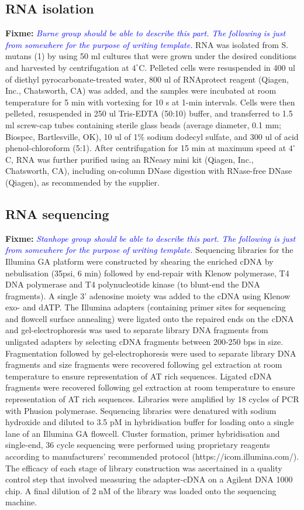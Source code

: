 \documentclass{article}
\newcommand{\fixme}[1]{{\textbf{Fixme:} \textit{\textcolor{blue}{#1}}}}
\begin{document}
\subsection{RNA isolation}
\fixme{Burne group should be able to describe this part. The following is just
from somewhere for the purpose of writing template.}
RNA was isolated from S. mutans (1) by using 50 ml cultures that were grown
under the desired conditions and harvested by centrifugation at $4^{\circ}$C. Pelleted
cells were resuspended in 400 ul of diethyl pyrocarbonate-treated water, 800 ul
of RNAprotect reagent (Qiagen, Inc., Chatsworth, CA) was added, and the samples
were incubated at room temperature for 5 min with vortexing for 10 s at 1-min
intervals. Cells were then pelleted, resuspended in 250 ul Tris-EDTA (50:10)
buffer, and transferred to 1.5 ml screw-cap tubes containing sterile glass beads
(average diameter, 0.1 mm; Biospec, Bartlesville, OK), 10 ul of 1\% sodium
dodecyl sulfate, and 300 ul of acid phenol-chloroform (5:1). After
centrifugation for 15 min at maximum speed at $4^{\circ}$C, RNA was further purified
using an RNeasy mini kit (Qiagen, Inc., Chatsworth, CA), including on-column
DNase digestion with RNase-free DNase (Qiagen), as recommended by the supplier.

\subsection{RNA sequencing}
\fixme{Stanhope group should be able to describe this part. The following is just
from somewhere for the purpose of writing template.}
Sequencing libraries for the Illumina GA platform were constructed by shearing
the enriched cDNA by nebulisation (35psi, 6 min) followed by end-repair with
Klenow polymerase, T4 DNA polymerase and T4 polynucleotide kinase (to blunt-end
the DNA fragments). A single 3' adenosine moiety was added to the cDNA using
Klenow exo- and dATP. The Illumina adapters (containing primer sites for
sequencing and flowcell surface annealing) were ligated onto the repaired ends
on the cDNA and gel-electrophoresis was used to separate library DNA fragments
from unligated adapters by selecting cDNA fragments between 200-250 bps in size.
Fragmentation followed by gel-electrophoresis were used to separate library DNA
fragments and size fragments were recovered following gel extraction at room
temperature to ensure representation of AT rich sequences. Ligated cDNA
fragments were recovered following gel extraction at room temperature to ensure
representation of AT rich sequences. Libraries were amplified by 18 cycles of
PCR with Phusion polymerase. Sequencing libraries were denatured with sodium
hydroxide and diluted to 3.5 pM in hybridisation buffer for loading onto a
single lane of an Illumina GA flowcell. Cluster formation, primer hybridisation
and single-end, 36 cycle sequencing were performed using proprietary reagents
according to manufacturers' recommended protocol (https://icom.illumina.com/).
The efficacy of each stage of library construction was ascertained in a quality
control step that involved measuring the adapter-cDNA on a Agilent DNA 1000
chip. A final dilution of 2 nM of the library was loaded onto the sequencing
machine.
\end{document}
